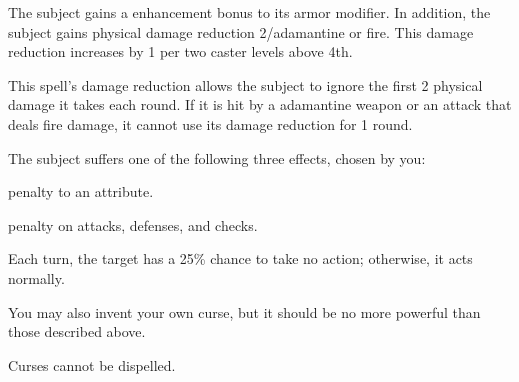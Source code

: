 \spelldur{\durshort}
\begin{spelleffect}
    The subject gains a  enhancement bonus to its armor modifier. \spellbonusscalingdescription In addition, the subject gains physical damage reduction 2/adamantine or fire. This damage reduction increases by 1 per two caster levels above 4th.
\end{spelleffect}
\begin{spellnotes}
    This spell's damage reduction allows the subject to ignore the first 2 physical damage it takes each round. If it is hit by a adamantine weapon or an attack that deals fire damage, it cannot use its damage reduction for 1 round.
\end{spellnotes}

\begin{spellsuccess}
    The subject suffers one of the following three effects, chosen by you:
    \begin{itemize*}
        \item {} penalty to an attribute.
        \item {} penalty on attacks, defenses, and checks.
        \item Each turn, the target has a 25\% chance to take no action; otherwise, it acts normally.
    \end{itemize*}
    \par You may also invent your own curse, but it should be no more powerful than those described above.
\end{spellsuccess}
\begin{spellnotes}
    Curses cannot be dispelled.
\end{spellnotes}

